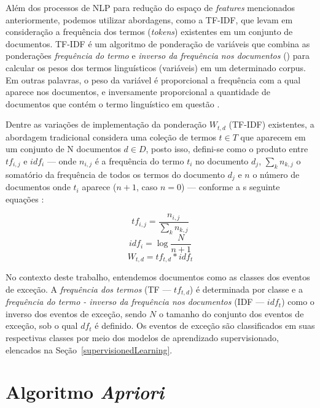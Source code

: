 \documentclass[
	12pt,				%
	oneside,			%
	a4paper,			%
	english,			%
	brazil				%
	]{abntex2ppgsi}
\begin{document}
{{{Além dos processos de NLP para redução do espaço de \textit{features} mencionados anteriormente, podemos utilizar abordagens, como a TF-IDF, que levam em consideração a frequência dos termos (\textit{tokens}) existentes em um conjunto de documentos. TF-IDF é um algoritmo de ponderação de variáveis que combina as ponderações \emph{frequência do termo}  e \emph{inverso da frequência nos documentos} () para calcular os pesos dos termos linguísticos (variáveis) em um determinado corpus. Em outras palavras, o peso da variável é proporcional a frequência com a qual aparece nos documentos, e inversamente proporcional a quantidade de documentos que contém o termo linguístico em questão \cite{wu2018improved, yahav2018comments}. 

Dentre as variações de implementação da ponderação $W_{t,d}$ (TF-IDF) existentes, a abordagem tradicional considera uma coleção de termos $t \in T$ que aparecem em um conjunto de N documentos $d \in D$, posto isso, defini-se como o produto entre $tf_{i,j}$ e $idf_i$ --- onde $n_{i,j}$ é a frequência do termo $t_i$ no documento $d_j$, $\sum_k n_{k,j}$ o somatório da frequência de todos os termos do documento $d_j$ e $n$ o número de documentos onde $t_i$ aparece ($n + 1$, caso $n = 0$) --- conforme a s seguinte equações \cite{wu2018improved}:

\begin{equation}
tf_{i,j} = \frac{n_{i,j}}{\sum_k n_{k,j}}
\end{equation}
\begin{equation}
idf_i = \log \frac{N}{n + 1}
\end{equation}
\begin{equation}
W_{t,d} = tf_{t,d} * idf_t
\end{equation}

No contexto deste trabalho, entendemos documentos como as classes dos eventos de exceção. A \emph{frequência dos termos} (TF --- $tf_{t,d}$) é determinada por classe e a \emph{frequência do termo - inverso da frequência nos documentos} (IDF --- $idf_t $) como o inverso dos eventos de exceção, sendo $N$ o tamanho do conjunto dos eventos de exceção, sob o qual $df_t$ é definido. Os eventos de exceção são classificados em suas respectivas classes por meio dos modelos de aprendizado supervisionado, elencados na Seção~\ref{supervisionedLearning}. 

\section{Algoritmo \textit{Apriori}}
\label{apriori}

}}}
\end{document}
